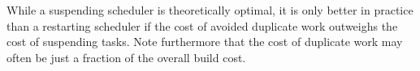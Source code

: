 \noindent
While a suspending scheduler is theoretically optimal, it is only better in
practice than a restarting scheduler if the cost of avoided duplicate work
outweighs the cost of suspending tasks. Note furthermore that the cost of
duplicate work may often be just a fraction of the overall build cost.
